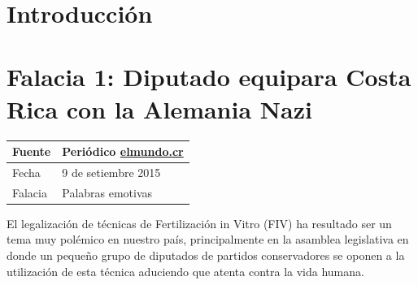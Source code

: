 \documentclass[times]{simauth}
\begin{document}

\title{
    { \fontsize{30}{1} \selectfont{
        Tarea \#3:\\ Falacias de razonamiento en medios de comunicación nacional}
    }
}

\author{
    { \fontsize{14}{1} \selectfont{
        Carlos Martín Flores González \\
        Raquel Rodríguez Chaves}
    }
}

%



\maketitle

\tableofcontents

\section{Introducción}

\newpage
\section{Falacia 1: Diputado equipara Costa Rica con la Alemania Nazi}
\begin{table}[h!]
    \begin{tabular}{ll} 
        \toprule[1.5pt]
        Fuente & Periódico \href{http://elmundo.cr}{elmundo.cr}\\
        \midrule[0.5pt]
        Fecha  & 9 de setiembre 2015\\
        \midrule[0.5pt]
        Falacia & Palabras emotivas \\
        \bottomrule[1.5pt]
    \end{tabular} 
\end{table}

El legalización de técnicas de Fertilización in Vitro (FIV) ha resultado ser un tema muy polémico en nuestro país, principalmente en la asamblea legislativa en donde un pequeño grupo de diputados de partidos conservadores se oponen a la utilización de esta técnica aduciendo que atenta contra la vida humana.
\end{document}
